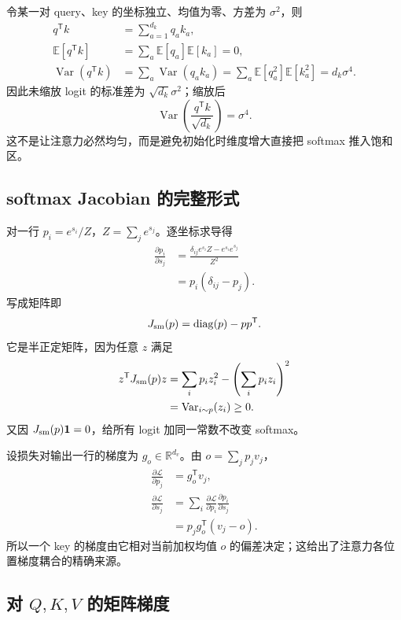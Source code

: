 \documentclass[11pt]{article}
\numberwithin{equation}{section}
\newcommand{\R}{\mathbb{R}}
\newcommand{\E}{\mathbb{E}}
\newcommand{\1}{\mathbf{1}}
\newcommand{\T}{\mathsf{T}}
\newcommand{\cL}{\mathcal{L}}
\newcommand{\diag}{\operatorname{diag}}
\newcommand{\Var}{\operatorname{Var}}
\begin{document}
令某一对 query、key 的坐标独立、均值为零、方差为 $\sigma^2$，则
\begin{align}
 q^\T k&=\sum_{a=1}^{d_k}q_ak_a,\\
 \E[q^\T k]&=\sum_a\E[q_a]\E[k_a]=0,\\
 \Var(q^\T k)
 &=\sum_a\Var(q_ak_a)
 =\sum_a\E[q_a^2]\E[k_a^2]
 =d_k\sigma^4.
\end{align}
因此未缩放 logit 的标准差为 $\sqrt{d_k}\sigma^2$；缩放后
\begin{equation}
 \Var\!\left(\frac{q^\T k}{\sqrt{d_k}}\right)=\sigma^4.
\end{equation}
这不是让注意力必然均匀，而是避免初始化时维度增大直接把 softmax 推入饱和区。

\subsection{softmax Jacobian 的完整形式}

对一行 $p_i=e^{s_i}/Z$，$Z=\sum_j e^{s_j}$。逐坐标求导得
\begin{align}
 \frac{\partial p_i}{\partial s_j}
 &=\frac{\delta_{ij}e^{s_i}Z-e^{s_i}e^{s_j}}{Z^2}\\
 &=p_i(\delta_{ij}-p_j).
\end{align}
写成矩阵即
\begin{equation}
 J_{\rm sm}(p)=\diag(p)-pp^\T.
\end{equation}
它是半正定矩阵，因为任意 $z$ 满足
\begin{align}
 z^\T J_{\rm sm}(p)z
 &=\sum_i p_i z_i^2-\left(\sum_i p_i z_i\right)^2\\
 &=\Var_{i\sim p}(z_i)\ge0.
\end{align}
又因 $J_{\rm sm}(p)\1=0$，给所有 logit 加同一常数不改变 softmax。

设损失对输出一行的梯度为 $g_o\in\R^{d_v}$。由 $o=\sum_jp_jv_j$，
\begin{align}
 \frac{\partial\cL}{\partial p_j}&=g_o^\T v_j,\\
 \frac{\partial\cL}{\partial s_j}
 &=\sum_i\frac{\partial\cL}{\partial p_i}
       \frac{\partial p_i}{\partial s_j}\\
 &=p_j g_o^\T(v_j-o).
\end{align}
所以一个 key 的梯度由它相对当前加权均值 $o$ 的偏差决定；这给出了注意力各位置梯度耦合的精确来源。

\subsection{对 $Q,K,V$ 的矩阵梯度}
\end{document}
